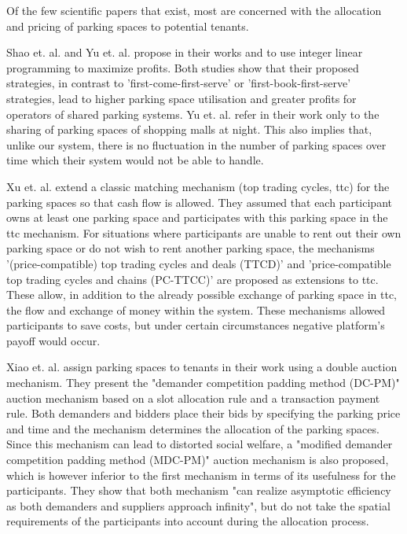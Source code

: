 \documentclass[
a4paper,     %
titlepage,   %
14pt         %
]{scrartcl}  %
\theoremstyle{mystyle}
\begin{document}
Of the few scientific papers that exist, most are concerned with the allocation and pricing of parking spaces to potential tenants.

Shao et. al. and Yu et. al. propose in their works \cite{shao2016simple} and \cite{yu2018optimal} to use integer linear programming to maximize profits. Both studies show that their proposed strategies, in contrast to 'first-come-first-serve' or 'first-book-first-serve' strategies, lead to higher parking space utilisation and greater profits for operators of shared parking systems. Yu et. al. refer in their work only to the sharing of parking spaces of shopping malls at night. This also implies that, unlike our system, there is no fluctuation in the number of parking spaces over time which their system would not be able to handle.

Xu et. al. extend a classic matching mechanism (top trading cycles, ttc) for the parking spaces so that cash flow is allowed. They assumed that each participant owns at least one parking space and participates with this parking space in the ttc mechanism. For situations where participants are unable to rent out their own parking space or do not wish to rent another parking space, the mechanisms '(price-compatible) top trading cycles and deals (TTCD)' and 'price-compatible top trading cycles and chains (PC-TTCC)' are proposed as extensions to ttc. These allow, in addition to the already possible exchange of parking space in ttc, the flow and exchange of money within the system. These mechanisms allowed participants to save costs, but under certain circumstances negative platform's payoff would occur. \cite{xu2016private}

Xiao et. al. assign parking spaces to tenants in their work using a double auction mechanism. They present the "demander competition padding method (DC-PM)" auction mechanism based on a slot allocation rule and a transaction payment rule. Both demanders and bidders place their bids by specifying the parking price and time and the mechanism determines the allocation of the parking spaces. Since this mechanism can lead to distorted social welfare, a "modified demander competition padding method (MDC-PM)" auction mechanism is also proposed, which is however inferior to the first mechanism in terms of its usefulness for the participants. They show that both mechanism "can realize asymptotic efficiency as both demanders and suppliers approach infinity", but do not take the spatial requirements of the participants into account during the allocation process. \cite{xiao2018shared}
\end{document}
